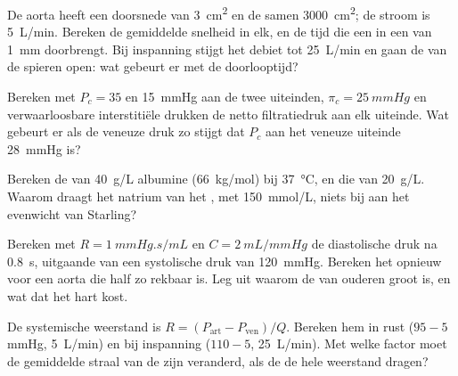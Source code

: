 \begin{exercise}[$\star\star$]\label{exo:b2:blood-circulation:7}
De aorta heeft een doorsnede van \qty{3}{cm^2} en de  samen
\qty{3000}{cm^2}; de stroom is \qty{5}{L/min}. Bereken de gemiddelde snelheid
in elk, en de tijd die een  in een  van \qty{1}{mm}
doorbrengt. Bij inspanning stijgt het debiet tot \qty{25}{L/min} en gaan de
 van de spieren open: wat gebeurt er met de doorlooptijd?
\end{exercise}

\begin{exercise}[$\star\star$]\label{exo:b2:blood-circulation:8}
Bereken met $P_c = 35$ en \qty{15}{mmHg} aan de twee uiteinden,
$\pi_c =
\qty{25}{mmHg}$ en verwaarloosbare interstitiële drukken de netto
filtratiedruk aan elk uiteinde. Wat gebeurt er als de veneuze druk zo
stijgt dat $P_c$ aan het veneuze uiteinde \qty{28}{mmHg} is?
\end{exercise}

\begin{exercise}[$\star\star$]\label{exo:b2:blood-circulation:9}
Bereken de  van \qty{40}{g/L} albumine
(\qty{66}{kg/mol}) bij \qty{37}{\celsius}, en die van \qty{20}{g/L}. Waarom
draagt het natrium van het , met \qty{150}{mmol/L}, niets bij aan het
evenwicht van Starling?
\end{exercise}

\begin{exercise}[$\star\star\star$]\label{exo:b2:blood-circulation:10}
Bereken met $R = \qty{1}{mmHg.s/mL}$ en $C = \qty{2}{mL/mmHg}$ de
diastolische druk na \qty{0.8}{s}, uitgaande van een systolische druk van
\qty{120}{mmHg}. Bereken het opnieuw voor een aorta die half zo rekbaar is.
Leg uit waarom de  van ouderen groot is, en wat dat het hart kost.
\end{exercise}

\begin{exercise}[$\star\star\star$]\label{exo:b2:blood-circulation:11}
De systemische weerstand is $R = (P_{\text{art}} - P_{\text{ven}})/Q$.
Bereken hem in rust ($95 - 5$ mmHg, \qty{5}{L/min}) en bij inspanning
($110 - 5$, \qty{25}{L/min}). Met welke factor moet de gemiddelde straal van
de  zijn veranderd, als de  de hele weerstand dragen?
\end{exercise}

